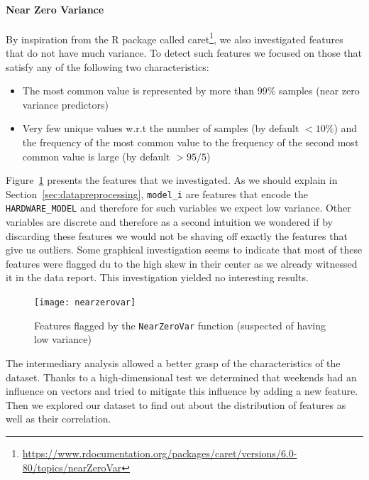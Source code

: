 \paragraph{Near Zero Variance}
By inspiration from the R package called caret\footnote{\url{https://www.rdocumentation.org/packages/caret/versions/6.0-80/topics/nearZeroVar}}, we also investigated features that do not have much variance. To detect such features we focused on those that satisfy any of the following two characteristics:
\begin{itemize}[noitemsep,topsep=0pt]
	\item The most common value is represented by more than 99\% samples (near zero variance predictors)
	\item Very few unique values w.r.t the number of samples (by default $<10\%$) and the frequency of the most common value to the frequency of the second most common value is large (by default $>95/5$)
\end{itemize}

Figure~\ref{nearzerovar} presents the features that we investigated. As we should explain in Section~\ref{sec:datapreprocessing}, \texttt{model\_i} are features that encode the \texttt{HARDWARE\_MODEL} and therefore for such variables we expect low variance. Other variables are discrete and therefore as a second intuition we wondered if by discarding these features we would not be shaving off exactly the features that give us outliers. Some graphical investigation seems to indicate that most of these features were flagged du to the high skew in their center as we already witnessed it in the data report. This investigation yielded no interesting results. 

\begin{figure}[ht]
    \begin{center}
    \texttt{[image: nearzerovar]}
    \end{center}
    \caption{Features flagged by the \texttt{NearZeroVar} function (suspected of having low variance)}
    \label{nearzerovar}
\end{figure}

\vspace{1\baselineskip}
The intermediary analysis allowed a better grasp of the characteristics of the dataset. Thanks to a high-dimensional test we determined that weekends had an influence on vectors and tried to mitigate this influence by adding a new feature. Then we explored our dataset to find out about the distribution of features as well as their correlation. 

